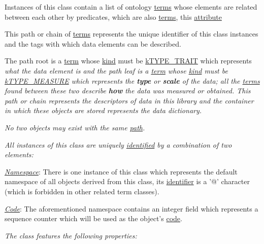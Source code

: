 Instances of this class contain a list of ontology \hyperlink{class_c_ontology_term}{terms} whose elements are related between each other by predicates, which are also \hyperlink{class_c_ontology_term}{terms}, this \hyperlink{}{attribute}

This path or chain of \hyperlink{class_c_ontology_term}{terms} represents the unique identifier of this class instances and the tags with which data elements can be described.

The path root is a \hyperlink{class_c_ontology_term}{term} whose \hyperlink{class_c_ontology_node_abfe1cb2e10bb53cf7d500c9860e5cb7a}{kind} must be \hyperlink{}{k\-T\-Y\-P\-E\-\_\-\-T\-R\-A\-I\-T} which represents {\itshape what the data element is and the path leaf is a \hyperlink{class_c_ontology_term}{term} whose \hyperlink{class_c_ontology_node_abfe1cb2e10bb53cf7d500c9860e5cb7a}{kind} must be \hyperlink{}{k\-T\-Y\-P\-E\-\_\-\-M\-E\-A\-S\-U\-R\-E} which represents the {\bfseries type} or {\bfseries scale} of the data; all the \hyperlink{class_c_ontology_term}{terms} found between these two describe {\bfseries how} the data was measured or obtained. This path or chain represents the {\itshape descriptors} of data in this library and the container in which these objects are stored represents the data dictionary.}

{\itshape No two objects may exist with the same \hyperlink{}{path}.}

{\itshape All instances of this class are uniquely \hyperlink{}{identified} by a combination of two elements\-:}

{\itshape 
\begin{DoxyItemize}
\item {\itshape \hyperlink{}{Namespace}}\-: There is one instance of this class which represents the default namespace of all objects derived from this class, its \hyperlink{}{identifier} is a '@' character (which is forbidden in other related term classes). 
\item {\itshape \hyperlink{}{Code}}\-: The aforementioned namespace contains an integer field which represents a sequence counter which will be used as the object's \hyperlink{}{code}. 
\end{DoxyItemize}}

{\itshape The class features the following properties\-:}

